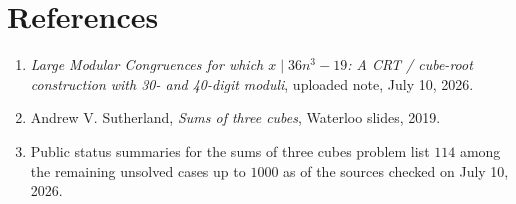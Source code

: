 \documentclass[11pt]{article}
\begin{document}
\section*{References}
\begin{enumerate}
\item \emph{Large Modular Congruences for which \(x\mid 36n^3-19\): A CRT / cube-root construction with 30- and 40-digit moduli}, uploaded note, July 10, 2026.
\item Andrew V. Sutherland, \emph{Sums of three cubes}, Waterloo slides, 2019.
\item Public status summaries for the sums of three cubes problem list \(114\) among the remaining unsolved cases up to \(1000\) as of the sources checked on July 10, 2026.
\end{enumerate}
\end{document}
